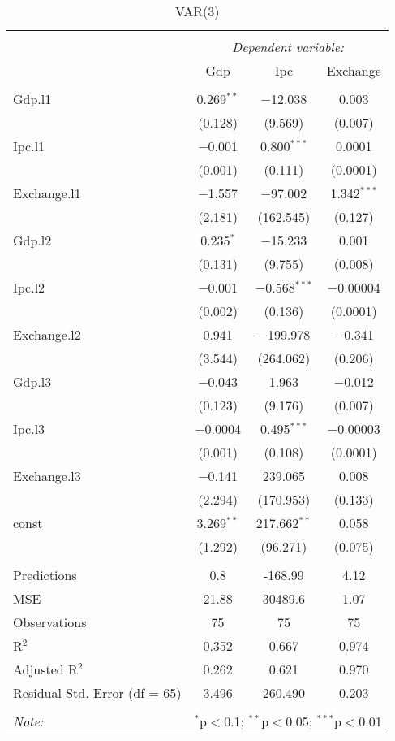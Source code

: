 
\begin{table}[H] \centering 
  \caption{VAR(3)} 
  \label{tb:var_3} 
\begin{tabular}{@{\extracolsep{5pt}}lccc} 
\\[-1.8ex]\hline 
\hline \\[-1.8ex] 
 & \multicolumn{3}{c}{\textit{Dependent variable:}} \\ 
\cline{2-4} 
 & Gdp & Ipc & Exchange \\ 
\hline \\[-1.8ex] 
 Gdp.l1 & 0.269$^{**}$ & $-$12.038 & 0.003 \\ 
  & (0.128) & (9.569) & (0.007) \\ 
  Ipc.l1 & $-$0.001 & 0.800$^{***}$ & 0.0001 \\ 
  & (0.001) & (0.111) & (0.0001) \\ 
  Exchange.l1 & $-$1.557 & $-$97.002 & 1.342$^{***}$ \\ 
  & (2.181) & (162.545) & (0.127) \\ 
  Gdp.l2 & 0.235$^{*}$ & $-$15.233 & 0.001 \\ 
  & (0.131) & (9.755) & (0.008) \\ 
  Ipc.l2 & $-$0.001 & $-$0.568$^{***}$ & $-$0.00004 \\ 
  & (0.002) & (0.136) & (0.0001) \\ 
  Exchange.l2 & 0.941 & $-$199.978 & $-$0.341 \\ 
  & (3.544) & (264.062) & (0.206) \\ 
  Gdp.l3 & $-$0.043 & 1.963 & $-$0.012 \\ 
  & (0.123) & (9.176) & (0.007) \\ 
  Ipc.l3 & $-$0.0004 & 0.495$^{***}$ & $-$0.00003 \\ 
  & (0.001) & (0.108) & (0.0001) \\ 
  Exchange.l3 & $-$0.141 & 239.065 & 0.008 \\ 
  & (2.294) & (170.953) & (0.133) \\ 
  const & 3.269$^{**}$ & 217.662$^{**}$ & 0.058 \\ 
  & (1.292) & (96.271) & (0.075) \\ 
 \hline \\[-1.8ex] 
Predictions & 0.8 & -168.99 & 4.12 \\ 
MSE & 21.88 & 30489.6 & 1.07 \\ 
Observations & 75 & 75 & 75 \\ 
R$^{2}$ & 0.352 & 0.667 & 0.974 \\ 
Adjusted R$^{2}$ & 0.262 & 0.621 & 0.970 \\ 
Residual Std. Error (df = 65) & 3.496 & 260.490 & 0.203 \\ 
\hline 
\hline \\[-1.8ex] 
\textit{Note:}  & \multicolumn{3}{r}{$^{*}$p$<$0.1; $^{**}$p$<$0.05; $^{***}$p$<$0.01} \\ 
\end{tabular} 
\end{table} 
